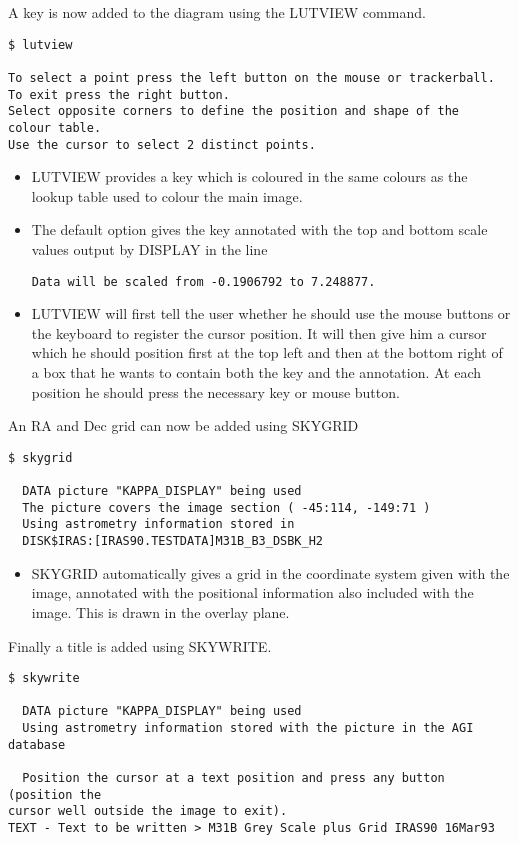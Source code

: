 \documentclass[twoside,11pt]{article}
\begin{document}
A key is now added to the diagram using the LUTVIEW command.
\begin{small}
\begin{verbatim}
$ lutview 

To select a point press the left button on the mouse or trackerball.
To exit press the right button.
Select opposite corners to define the position and shape of the
colour table.
Use the cursor to select 2 distinct points.
\end{verbatim}
\end{small}
\begin{itemize}
\item LUTVIEW provides a key which is coloured in the same colours as the
lookup table used to colour the main image.
\item The default option gives the key annotated with the top and bottom scale
values output by DISPLAY in the line
\begin{small}
\begin{verbatim}
Data will be scaled from -0.1906792 to 7.248877.
\end{verbatim}
\end{small}
\item LUTVIEW will first tell the user whether he should use the mouse buttons
or the keyboard to register the cursor position. It will then give him a cursor
which he should position first at the  top left and then at the bottom right
of a box that he wants to contain both the key and the annotation. At each 
position he should press the necessary key or mouse button.
\end{itemize}
An RA and Dec grid can now be added using SKYGRID
\begin{small}
\begin{verbatim}
$ skygrid

  DATA picture "KAPPA_DISPLAY" being used
  The picture covers the image section ( -45:114, -149:71 )
  Using astrometry information stored in
  DISK$IRAS:[IRAS90.TESTDATA]M31B_B3_DSBK_H2

\end{verbatim}
\end{small}
\begin{itemize}
\item SKYGRID automatically gives a grid in the coordinate system given with 
the image, annotated with the positional information also included with the 
image. This is drawn in the overlay  plane.
\end{itemize}
Finally a title is added using SKYWRITE.
\begin{small}
\begin{verbatim}
$ skywrite

  DATA picture "KAPPA_DISPLAY" being used
  Using astrometry information stored with the picture in the AGI database

  Position the cursor at a text position and press any button (position the
cursor well outside the image to exit).
TEXT - Text to be written > M31B Grey Scale plus Grid IRAS90 16Mar93
\end{verbatim}
\end{small}
\end{document}
